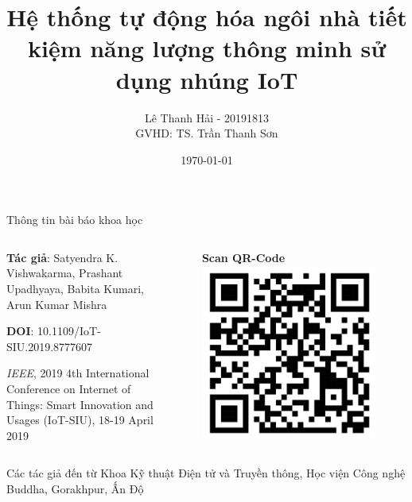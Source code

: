 \documentclass[11pt]{beamer}
\title{Hệ thống tự động hóa ngôi nhà tiết kiệm năng lượng thông minh sử dụng nhúng IoT}
\author{Lê Thanh Hải - 20191813\\GVHD: TS. Trần Thanh Sơn\\[20pt]}
\date{\today}
\renewcommand{\label}[1]{%
			\gdef\sfname{sf:##1}}%
\begin{document}

\begin{frame}
	\titlepage
\end{frame}



\begin{frame}[t]{Thông tin bài báo khoa học} \vspace{4pt}
	\begin{columns}
		\begin{column}{0.5\textwidth}
			\textbf{Tác giả}: Satyendra K. Vishwakarma, Prashant Upadhyaya, Babita Kumari, Arun Kumar Mishra
			
			\vspace{4pt}
			\textbf{DOI}: 10.1109/IoT-SIU.2019.8777607
			
			\vspace{7pt}
			\emph{IEEE}, 2019 4th International Conference on Internet of Things: Smart Innovation and Usages (IoT-SIU), 18-19 April 2019
			
		\end{column}

		\begin{column}{0.5\textwidth}  %
			\begin{center}
				\begin{figure}
					\textbf{Scan QR-Code}
					\includegraphics[width=1\textwidth]{Image/IoT_QR.png}
				\end{figure}
			\end{center}
		\end{column}
	\end{columns}
	Các tác giả đến từ Khoa Kỹ thuật Điện tử và Truyền thông, Học viện Công nghệ Buddha, Gorakhpur, Ấn Độ
\end{frame}
\end{document}
